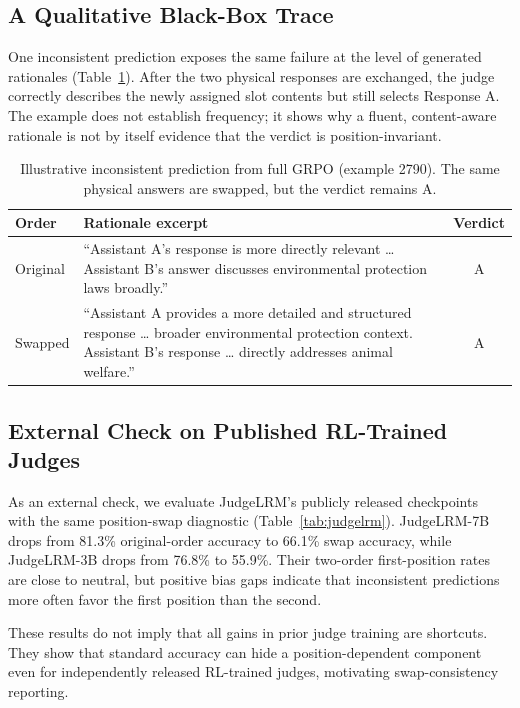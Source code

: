 \documentclass[letterpaper]{article}
\begin{document}
\subsection{A Qualitative Black-Box Trace}

One inconsistent prediction exposes the same failure at the level of generated rationales (Table~\ref{tab:case}). After the two physical responses are exchanged, the judge correctly describes the newly assigned slot contents but still selects Response A. The example does not establish frequency; it shows why a fluent, content-aware rationale is not by itself evidence that the verdict is position-invariant.

\begin{table}[H]
\centering
\scriptsize
\setlength{\tabcolsep}{2.5pt}
\begin{tabular}{p{}p{}c}
\toprule
\textbf{Order} & \textbf{Rationale excerpt} & \textbf{Verdict} \\
\midrule
Original & ``Assistant A's response is more directly relevant \ldots{} Assistant B's answer discusses environmental protection laws broadly.'' & A \\
Swapped & ``Assistant A provides a more detailed and structured response \ldots{} broader environmental protection context. Assistant B's response \ldots{} directly addresses animal welfare.'' & A \\
\bottomrule
\end{tabular}
\caption{Illustrative inconsistent prediction from full GRPO (example 2790). The same physical answers are swapped, but the verdict remains A.}
\label{tab:case}
\end{table}

\subsection{External Check on Published RL-Trained Judges}

As an external check, we evaluate JudgeLRM's publicly released checkpoints~\citep{chen2025judgelrm} with the same position-swap diagnostic (Table~\ref{tab:judgelrm}). JudgeLRM-7B drops from 81.3\% original-order accuracy to 66.1\% swap accuracy, while JudgeLRM-3B drops from 76.8\% to 55.9\%. Their two-order first-position rates are close to neutral, but positive bias gaps indicate that inconsistent predictions more often favor the first position than the second.

These results do not imply that all gains in prior judge training are shortcuts. They show that standard accuracy can hide a position-dependent component even for independently released RL-trained judges, motivating swap-consistency reporting.
\end{document}
